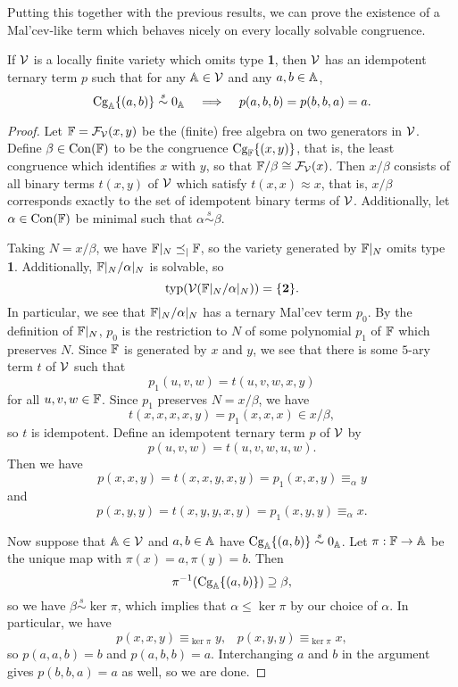 \begin{appendices}
Putting this together with the previous results, we can prove the existence of a Mal'cev-like term which behaves nicely on every locally solvable congruence.

\begin{thm}\label{thm-loc-solvable-malcev} If $\mathcal{V}$ is a locally finite variety which omits type \textbf{1}, then $\mathcal{V}$ has an idempotent ternary term $p$ such that for any $\mathbb{A} \in \mathcal{V}$ and any $a,b \in \mathbb{A}$,
\[
\operatorname{Cg}_{\mathbb{A}}\{(a,b)\} \stackrel{s}{\sim} 0_{\mathbb{A}} \;\;\; \implies \;\;\; p(a,b,b) = p(b,b,a) = a.
\]
\end{thm}
\begin{proof} Let $\mathbb{F} = \mathcal{F}_{\mathcal{V}}(x,y)$ be the (finite) free algebra on two generators in $\mathcal{V}$. Define $\beta \in \operatorname{Con}(\mathbb{F})$ to be the congruence $\operatorname{Cg}_{\mathbb{F}}\{(x,y)\}$, that is, the least congruence which identifies $x$ with $y$, so that $\mathbb{F}/\beta \cong \mathcal{F}_{\mathcal{V}}(x)$. Then $x/\beta$ consists of all binary terms $t(x,y)$ of $\mathcal{V}$ which satisfy $t(x,x) \approx x$, that is, $x/\beta$ corresponds exactly to the set of idempotent binary terms of $\mathcal{V}$. Additionally, let $\alpha \in \operatorname{Con}(\mathbb{F})$ be minimal such that $\alpha \stackrel{s}{\sim} \beta$.

Taking $N = x/\beta$, we have $\mathbb{F}|_N \preceq_| \mathbb{F}$, so the variety generated by $\mathbb{F}|_N$ omits type \textbf{1}. Additionally, $\mathbb{F}|_N/\alpha|_N$ is solvable, so
\[
\operatorname{typ}(\mathcal{V}(\mathbb{F}|_N/\alpha|_N)) = \{\textbf{2}\}.
\]
In particular, we see that $\mathbb{F}|_N/\alpha|_N$ has a ternary Mal'cev term $p_0$. By the definition of $\mathbb{F}|_N$, $p_0$ is the restriction to $N$ of some polynomial $p_1$ of $\mathbb{F}$ which preserves $N$. Since $\mathbb{F}$ is generated by $x$ and $y$, we see that there is some $5$-ary term $t$ of $\mathcal{V}$ such that
\[
p_1(u,v,w) = t(u,v,w,x,y)
\]
for all $u,v,w \in \mathbb{F}$. Since $p_1$ preserves $N = x/\beta$, we have
\[
t(x,x,x,x,y) = p_1(x,x,x) \in x/\beta,
\]
so $t$ is idempotent. Define an idempotent ternary term $p$ of $\mathcal{V}$ by
\[
p(u,v,w) = t(u,v,w,u,w).
\]
Then we have
\[
p(x,x,y) = t(x,x,y,x,y) = p_1(x,x,y) \equiv_\alpha y
\]
and
\[
p(x,y,y) = t(x,y,y,x,y) = p_1(x,y,y) \equiv_\alpha x.
\]

Now suppose that $\mathbb{A} \in \mathcal{V}$ and $a,b \in \mathbb{A}$ have $\operatorname{Cg}_{\mathbb{A}}\{(a,b)\} \stackrel{s}{\sim} 0_{\mathbb{A}}$. Let $\pi : \mathbb{F} \rightarrow \mathbb{A}$ be the unique map with $\pi(x) = a, \pi(y) = b$. Then
\[
\pi^{-1}(\operatorname{Cg}_{\mathbb{A}}\{(a,b)\}) \supseteq \beta,
\]
so we have $\beta \stackrel{s}{\sim} \ker \pi$, which implies that $\alpha \le \ker \pi$ by our choice of $\alpha$. In particular, we have
\[
p(x,x,y) \equiv_{\ker \pi} y, \;\;\; p(x,y,y) \equiv_{\ker \pi} x,
\]
so $p(a,a,b) = b$ and $p(a,b,b) = a$. Interchanging $a$ and $b$ in the argument gives $p(b,b,a) = a$ as well, so we are done.
\end{proof}


\end{appendices}
